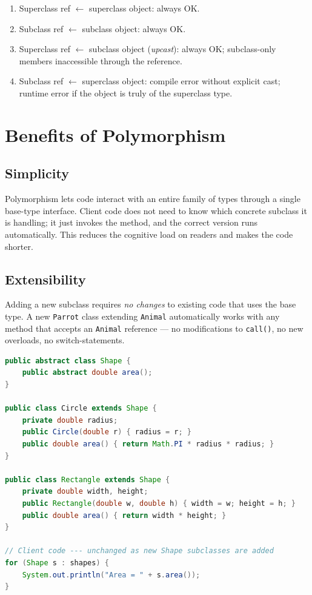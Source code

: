 \documentclass[11pt, a4paper, notitlepage]{report}
\theoremstyle{definition}
\theoremstyle{remark}
\theoremstyle{definition}
\begin{document}
\begin{examtip}[title={Assignment Compatibility Rules}]
\begin{enumerate}
  \item Superclass ref $\leftarrow$ superclass object: always OK.
  \item Subclass ref $\leftarrow$ subclass object: always OK.
  \item Superclass ref $\leftarrow$ subclass object (\emph{upcast}): always OK; subclass-only members inaccessible through the reference.
  \item Subclass ref $\leftarrow$ superclass object: compile error without explicit cast; runtime error if the object is truly of the superclass type.
\end{enumerate}
\end{examtip}

\section{Benefits of Polymorphism}
\label{sec:ch5-benefits}

\subsection{Simplicity}
\label{sec:ch5-simplicity}

Polymorphism lets code interact with an entire family of types through a single base-type interface.  Client code does not need to know which concrete subclass it is handling; it just invokes the method, and the correct version runs automatically.  This reduces the cognitive load on readers and makes the code shorter.

\subsection{Extensibility}
\label{sec:ch5-extensibility}

Adding a new subclass requires \emph{no changes} to existing code that uses the base type.  A new \texttt{Parrot} class extending \texttt{Animal} automatically works with any method that accepts an \texttt{Animal} reference --- no modifications to \texttt{call()}, no new overloads, no switch-statements.

\begin{lstlisting}[language=Java, caption={Adding a new \texttt{Circle} subtype requires zero changes to the loop.}]
public abstract class Shape {
    public abstract double area();
}

public class Circle extends Shape {
    private double radius;
    public Circle(double r) { radius = r; }
    public double area() { return Math.PI * radius * radius; }
}

public class Rectangle extends Shape {
    private double width, height;
    public Rectangle(double w, double h) { width = w; height = h; }
    public double area() { return width * height; }
}

// Client code --- unchanged as new Shape subclasses are added
for (Shape s : shapes) {
    System.out.println("Area = " + s.area());
}
\end{lstlisting}
\end{document}
